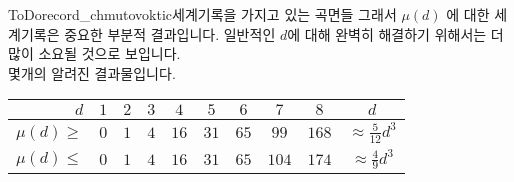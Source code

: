 \begin{surferIntroPage}{ToDo}{record_chmutovoktic}{세계기록을 가지고 있는 곡면들}
그래서 $\mu(d)$ 에 대한 세계기록은 중요한 부분적 결과입니다. 일반적인 $d$에 대해 완벽히 해결하기 위해서는 더 많이 소요될 것으로 보입니다. \\  몇개의 알려진 결과물입니다.  
    
   \begin{center}
      \begin{tabular}{r|cccccccc|c}
        $d$ & $1$ & $2$ & $3$ & $4$ & $5$ & $6$ & $7$ & $8$ & $d$\\
        \hline
        \hline
        \rule{0pt}{1.2em}$\mu(d)\ge$ & $0$ & $1$ & $4$ & $16$ & $31$ & $65$ &
        $99$ & $168$ & 
        $\approx \frac{5}{12}d^3$\\[0.3em]
        \hline
        \rule{0pt}{1.2em}$\mu(d)\le$ & $0$ & $1$ & $4$ & $16$ & $31$ & $65$ &
        $104$ & $174$ & $\approx \frac{4}{9}d^3$
      \end{tabular}
    \end{center}
\end{surferIntroPage}
